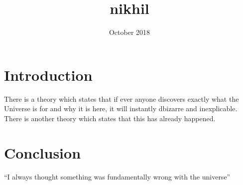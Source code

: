 \documentclass{article}
\title{nikhil}
\date{October 2018}
\begin{document}
\maketitle

\section{Introduction}
There is a theory which states that if ever anyone discovers exactly what the Universe is for and why it is here, it will instantly dbizarre and inexplicable.
There is another theory which states that this has already happened.


\section{Conclusion}
``I always thought something was fundamentally wrong with the universe'' \citep{adams1995hitchhiker}



\end{document}
